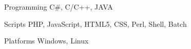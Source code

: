 


\begin{cvskills}


\cvskill
{Programming} %
{C\#, C/C++, JAVA} %


\cvskill
{Scripts} %
{PHP, JavaScript, HTML5, CSS, Perl, Shell, Batch} %


\cvskill
{Platforms} %
{Windows, Linux} %


\end{cvskills}
